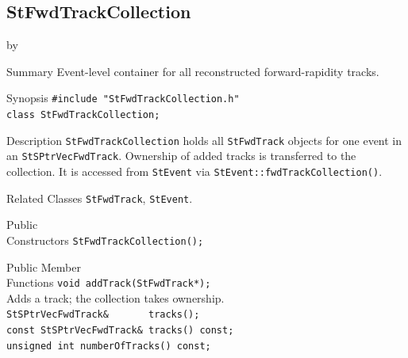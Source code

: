 \documentclass[twoside]{article}
\newcommand{\entrylabel}[1]{\mbox{\textbf{{#1}}}\hfil}%
\newenvironment{entry}
{\begin{list}{}%
    {\renewcommand{\makelabel}{\entrylabel}%
     \setlength{\labelwidth}{90pt}%
     \setlength{\leftmargin}{\labelwidth}
     \advance\leftmargin by \labelsep%
      }%
    }%
  {\end{list}}
\newcommand{\Entrylabel}[1]%
{\raisebox{0pt}[1ex][0pt]{\makebox[\labelwidth][l]%
    {\parbox[t]{\labelwidth}{\hspace{0pt}\textbf{{#1}}}}}}
\newenvironment{Entry}%
{\renewcommand{\entrylabel}{\Entrylabel}\begin{entry}}%
  {\end{entry}}
\begin{document}
\subsection{StFwdTrackCollection}
\label{sec:StFwdTrackCollection}
\begin{Entry}
\item[Summary] Event-level container for all reconstructed forward-rapidity tracks.
\item[Synopsis]
    \verb+#include "StFwdTrackCollection.h"+\\
    \verb+class StFwdTrackCollection;+\\
\item[Description]
  \texttt{StFwdTrackCollection} holds all \texttt{StFwdTrack} objects for one event in an
  \texttt{StSPtrVecFwdTrack}.  Ownership of added tracks is transferred to the
  collection.  It is accessed from \texttt{StEvent} via
  \texttt{StEvent::fwdTrackCollection()}.
\item[Related Classes]
  \texttt{StFwdTrack}, \texttt{StEvent}.
\item[Public\\ Constructors]
    \verb+StFwdTrackCollection();+\\
\item[Public Member\\ Functions]
    \verb+void addTrack(StFwdTrack*);+\\
    Adds a track; the collection takes ownership.\\[2pt]
    \verb+StSPtrVecFwdTrack&       tracks();+\\
    \verb+const StSPtrVecFwdTrack& tracks() const;+\\
    \verb+unsigned int numberOfTracks() const;+\\
\end{Entry}
\clearpage

\end{document}
